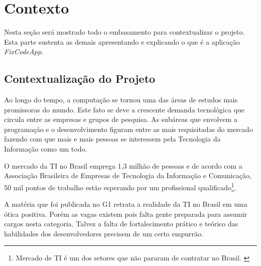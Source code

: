 \documentclass[
	article,			%
	11pt,				%
	oneside,			%
	a4paper,			%
	english,			%
	brazil,				%
	sumario=tradicional
	]{abntex2}
\begin{document}
\frenchspacing 



\maketitle
\tableofcontents
\newpage 



\textual

\section{Contexto}
Nesta seção será mostrado todo o embasamento para contextualizar o projeto. Esta parte sustenta as demais apresentando e explicando o que é a aplicação \textit{FixCodeApp}.

\subsection{Contextualização do Projeto}

Ao longo do tempo, a computação se tornou uma das áreas de estudos mais promissoras do mundo. Este fato se deve a crescente demanda tecnológica que circula entre as empresas e grupos de pesquisa. As subáreas que envolvem a programação e o desenvolvimento figuram entre as mais requisitadas do mercado fazendo com que mais e mais pessoas se interessem pela Tecnologia da Informação como um todo.

O mercado da TI no Brasil emprega 1,3 milhão de pessoas e de acordo com a Associação Brasileira de Empresas de Tecnologia da Informação e Comunicação, 50 mil pontos de trabalho estão esperando por um profissional qualificado\footnote{Mercado de TI é um dos setores que não pararam de contratar no Brasil. \cite{g1}}.

A matéria que foi publicada no G1 retrata a realidade da TI no Brasil em uma ótica positiva. Porém as vagas existem pois falta gente preparada para assumir cargos nesta categoria. Talvez a falta de fortalecimento prático e teórico das habilidades dos desenvolvedores precisem de um certo empurrão.
\end{document}
